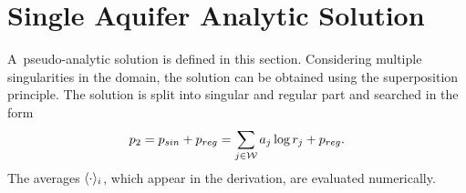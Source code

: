 \section{Single Aquifer Analytic Solution} \label{sec:prim_analytic_solution}
A~pseudo-analytic solution is defined in this section. Considering multiple singularities in the domain,
the solution can be obtained using the superposition principle.
The solution is split into singular and regular part and searched in the form
\begin{equation}
p_2 = p_{sin} + p_{reg} = \sum\limits_{j\in\mathcal{W}} a_j\log r_j + p_{reg}. \label{eqn:2d_press_sol_mult}\\
\end{equation}
The averages $\langle\cdot\rangle_i$, which appear in the derivation, are evaluated numerically.


